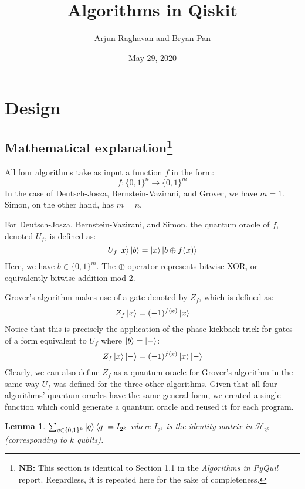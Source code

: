 \documentclass[12pt]{article}
\title{Algorithms in Qiskit}
\author{Arjun Raghavan and Bryan Pan}
\date{May 29, 2020}
\newtheorem{lemma}{Lemma}
\begin{document}
\mktitle
\startbody

\section{Design}

\subsection[Mathematical explanation]{Mathematical explanation\protect\footnote{\textbf{NB:} This section is identical to Section 1.1 in the \emph{Algorithms in PyQuil} report.  Regardless, it is repeated here for the sake of completeness.}}

All four algorithms take as input a function $f$ in the form:
\[
    f : \{0,1\}^n \to \{0,1\}^m
\]
In the case of Deutsch-Josza, Bernstein-Vazirani, and Grover, we have $m=1$.
Simon, on the other hand, has $m=n$.

For Deutsch-Josza, Bernstein-Vazirani, and Simon, the quantum oracle of $f$, denoted $U_f$, is defined as:
\[
    U_f\ket{x}\ket{b} = \ket{x}\ket{b \oplus f(x)}
\]
Here, we have $b \in \{0,1\}^m$.
The $\oplus$ operator represents bitwise XOR, or equivalently bitwise addition mod 2.

Grover's algorithm makes use of a gate denoted by $Z_f$, which is defined as:
\[
    Z_f\ket{x} = (-1)^{f(x)}\ket{x}
\]
Notice that this is precisely the application of the phase kickback trick for gates of a form equivalent to $U_f$ where $\ket{b} = \ket{-}$:
\[
    Z_f\ket{x}\ket{-} = (-1)^{f(x)}\ket{x}\ket{-}
\]
Clearly, we can also define $Z_f$ as a quantum oracle for Grover's algorithm in the same way $U_f$ was defined for the three other algorithms.
Given that all four algorithms' quantum oracles have the same general form, we created a single function which could generate a quantum oracle and reused it for each program.

\begin{lemma}
    $\sum_{q \in \{0,1\}^k}{\ket{q}\bra{q}} = I_{2^k}$ where $I_{2^k}$ is the identity matrix in $\mathcal{H}_{2^k}$ (corresponding to $k$ qubits).
\end{lemma}
\end{document}
